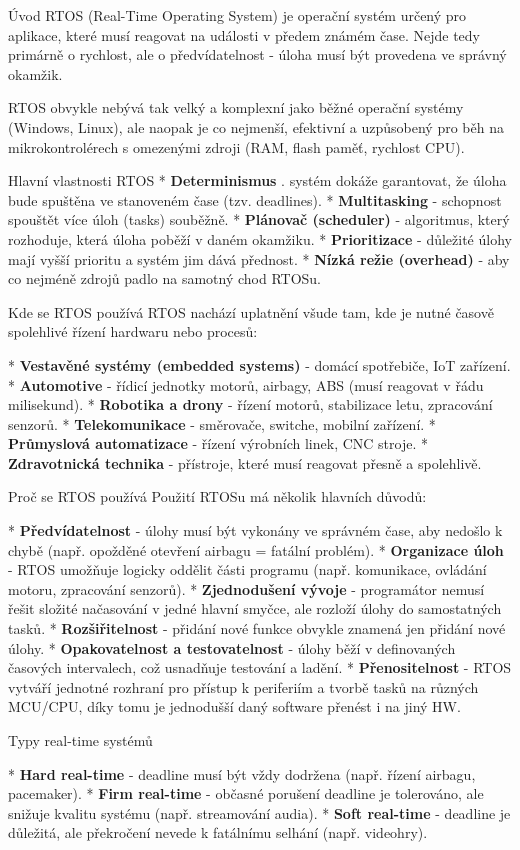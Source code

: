 \chap Úvod
RTOS (Real-Time Operating System) je operační systém určený pro aplikace, které musí reagovat na události v předem známém čase. Nejde tedy primárně o rychlost, ale o předvídatelnost - úloha musí být provedena ve správný okamžik.

RTOS obvykle nebývá tak velký a komplexní jako běžné operační systémy (Windows, Linux), ale naopak je co nejmenší, efektivní a uzpůsobený pro běh na mikrokontrolérech s omezenými zdroji (RAM, flash paměť, rychlost CPU).


\sec Hlavní vlastnosti RTOS
\begitems
* {\bf Determinismus} . systém dokáže garantovat, že úloha bude spuštěna ve stanoveném čase (tzv. deadlines).
* {\bf Multitasking} - schopnost spouštět více úloh (tasks) souběžně.
* {\bf Plánovač (scheduler)} - algoritmus, který rozhoduje, která úloha poběží v daném okamžiku.
* {\bf Prioritizace} - důležité úlohy mají vyšší prioritu a systém jim dává přednost.
* {\bf Nízká režie (overhead)} - aby co nejméně zdrojů padlo na samotný chod RTOSu.
\enditems

\sec Kde se RTOS používá
RTOS nachází uplatnění všude tam, kde je nutné časově spolehlivé řízení hardwaru nebo procesů:

\begitems 
* {\bf Vestavěné systémy (embedded systems)} - domácí spotřebiče, IoT zařízení.
* {\bf Automotive} - řídicí jednotky motorů, airbagy, ABS (musí reagovat v řádu milisekund).
* {\bf Robotika a drony} - řízení motorů, stabilizace letu, zpracování senzorů.
* {\bf Telekomunikace} - směrovače, switche, mobilní zařízení. 
* {\bf Průmyslová automatizace} - řízení výrobních linek, CNC stroje.
* {\bf Zdravotnická technika} - přístroje, které musí reagovat přesně a spolehlivě.
\enditems

\sec Proč se RTOS používá
Použití RTOSu má několik hlavních důvodů:

\begitems
* {\bf Předvídatelnost} - úlohy musí být vykonány ve správném čase, aby nedošlo k chybě (např. opožděné otevření airbagu = fatální problém).
* {\bf Organizace úloh} - RTOS umožňuje logicky oddělit části programu (např. komunikace, ovládání motoru, zpracování senzorů).
* {\bf Zjednodušení vývoje} - programátor nemusí řešit složité načasování v jedné hlavní smyčce, ale rozloží úlohy do samostatných tasků.
* {\bf Rozšiřitelnost} - přidání nové funkce obvykle znamená jen přidání nové úlohy.
* {\bf Opakovatelnost a testovatelnost} - úlohy běží v definovaných časových intervalech, což usnadňuje testování a ladění.
* {\bf Přenositelnost} - RTOS vytváří jednotné rozhraní pro přístup k periferiím a tvorbě tasků na různých MCU/CPU, díky tomu je jednodušší daný software přenést i na jiný HW.
\enditems

\sec Typy real-time systémů

\begitems
* {\bf Hard real-time} - deadline musí být vždy dodržena (např. řízení airbagu, pacemaker).
* {\bf Firm real-time} - občasné porušení deadline je tolerováno, ale snižuje kvalitu systému (např. streamování audia).
* {\bf Soft real-time} - deadline je důležitá, ale překročení nevede k fatálnímu selhání (např. videohry).
\enditems

